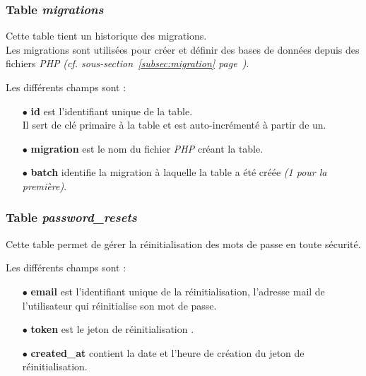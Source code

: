 \newpage

\subsubsection{Table \textit{migrations}}
\label{sec:table-migrations}
Cette table tient un historique des migrations.\\
Les migrations sont utilisées pour créer et définir des bases de données depuis des fichiers \textit{PHP} \textit{(cf. sous-section~\ref{subsec:migration} page~\pageref{subsec:migration})}. 


Les différents champs sont :

\begin{itemize}
    
    \item[$\bullet$] \textbf{id} est l'identifiant unique de la table.\\
    Il sert de clé primaire à la table et est auto-incrémenté à partir de un.
    
    \item[$\bullet$] \textbf{migration} est le nom du fichier \textit{PHP} créant la table.
    
    \item[$\bullet$] \textbf{batch} identifie la migration à laquelle la table a été créée \textit{(1 pour la première)}.
    
\end{itemize}


\subsubsection{Table \textit{password\_resets}}
\label{sec:table-password-resets}
Cette table permet de gérer la réinitialisation des mots de passe en toute sécurité.

Les différents champs sont :

\begin{itemize}
    
    \item[$\bullet$] \textbf{email} est l'identifiant unique de la réinitialisation, l'adresse mail de l'utilisateur qui réinitialise son mot de passe.
    
    \item[$\bullet$] \textbf{token} est le jeton de réinitialisation .
    
    \item[$\bullet$] \textbf{created\_at} contient la date et l'heure de création du jeton de réinitialisation.
    
\end{itemize}

